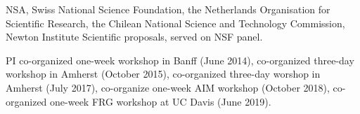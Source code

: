\documentclass[11pt]{amsart}
\theoremstyle{plain}
\theoremstyle{definition}
\theoremstyle{remark}
\begin{document}
 NSA, Swiss National Science Foundation,
 the Netherlands Organisation for Scientific Research, the Chilean National Science and Technology Commission,
Newton Institute Scientific proposals, served on NSF panel.


\medskip

PI co-organized one-week workshop in Banff (June 2014), co-organized three-day workshop in Amherst (October 2015), co-organized
three-day worshop in Amherst (July 2017), co-organize one-week AIM workshop (October 2018), co-organized one-week FRG workshop
at UC Davis (June 2019).

\medskip

\medskip


\end{document}
